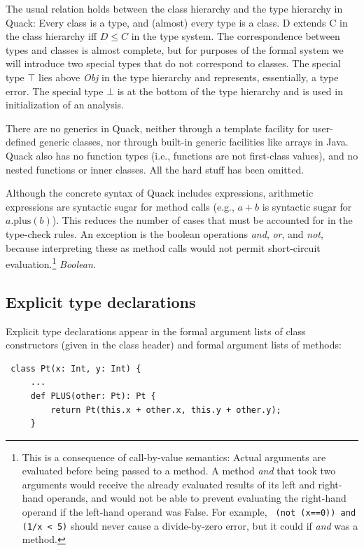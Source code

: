 \documentclass[11pt]{article}
\begin{document}
The usual relation holds between the class hierarchy and the
type hierarchy in Quack:  Every class is a type, and (almost) every type is a
class. D extends C in the class hierarchy iff $D \le C$ in the type
system.  The correspondence
  between types and classes is almost complete, but for purposes of
  the formal system we will introduce two special types that
  do not correspond to classes.  The special type $\top$ lies 
  above \emph{Obj} in the type hierarchy and represents, essentially,
  a type error.  The special type $\bot$ is at the bottom of the type
  hierarchy and is used in initialization of an analysis.

There are no generics in Quack, neither through a template facility
for user-defined generic classes, nor through built-in generic
facilities like arrays in Java.  Quack also has no function types (i.e.,
functions are not first-class values), and no nested functions or
inner classes.   All the hard stuff has been omitted. 

Although the concrete syntax of Quack includes expressions, arithmetic
expressions are syntactic sugar for method calls (e.g., $a+b$ is
syntactic sugar for $a.\mbox{plus}(b)$).  This reduces the number of
cases that must be accounted for in the type-check rules.  An
exception is the boolean operations \emph{and}, \emph{or}, and
\emph{not}, because interpreting these as method calls would not
permit short-circuit evaluation.\footnote{This is a consequence of 
call-by-value semantics:  Actual arguments are evaluated before being
passed to a method.   A method \emph{and} that took two arguments
would  receive the already evaluated results of its left and
right-hand operands, and would not be able to prevent evaluating the
right-hand operand if the left-hand operand was False. 
For example, \texttt{ (not (x==0)) and (1/x < 5)} should 
never cause a divide-by-zero error, but it could 
if \emph{and} was a method.}
\emph{Boolean}. 

\subsection{Explicit type declarations}

Explicit type declarations appear in the formal argument lists of
class constructors (given in the class header) and formal argument
lists of methods: 

\begin{verbatim}
 class Pt(x: Int, y: Int) {
     ...  
     def PLUS(other: Pt): Pt {
         return Pt(this.x + other.x, this.y + other.y); 
     }
\end{verbatim}
\end{document}
